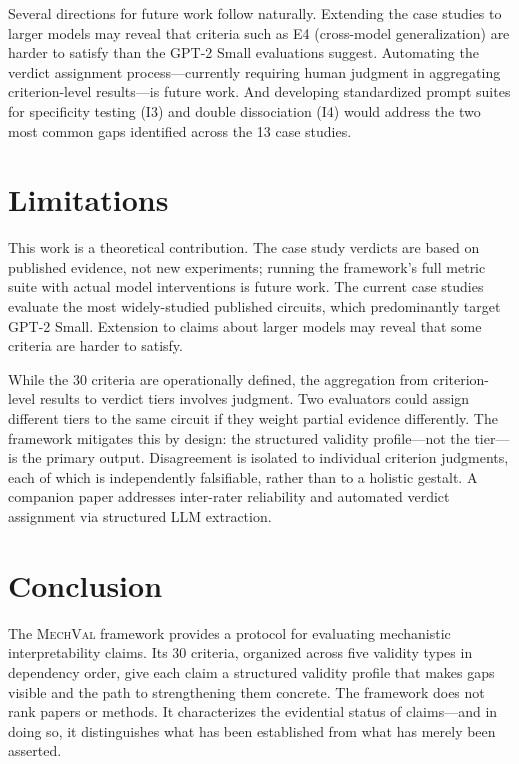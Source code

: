 \documentclass[10pt]{article}
\newcommand{\mechval}{\textsc{MechVal}}
\begin{document}
Several directions for future work follow naturally. Extending the case studies to larger models may reveal that criteria such as E4 (cross-model generalization) are harder to satisfy than the GPT-2 Small evaluations suggest. Automating the verdict assignment process---currently requiring human judgment in aggregating criterion-level results---is future work. And developing standardized prompt suites for specificity testing (I3) and double dissociation (I4) would address the two most common gaps identified across the 13 case studies.

\section{Limitations}
\label{sec:limitations}

This work is a theoretical contribution. The case study verdicts are based on published evidence, not new experiments; running the framework's full metric suite with actual model interventions is future work. The current case studies evaluate the most widely-studied published circuits, which predominantly target GPT-2 Small. Extension to claims about larger models may reveal that some criteria are harder to satisfy.

While the 30 criteria are operationally defined, the aggregation from criterion-level results to verdict tiers involves judgment. Two evaluators could assign different tiers to the same circuit if they weight partial evidence differently. The framework mitigates this by design: the structured validity profile---not the tier---is the primary output. Disagreement is isolated to individual criterion judgments, each of which is independently falsifiable, rather than to a holistic gestalt. A companion paper addresses inter-rater reliability and automated verdict assignment via structured LLM extraction.

\section{Conclusion}
\label{sec:conclusion}

The \mechval{} framework provides a protocol for evaluating mechanistic interpretability claims. Its 30 criteria, organized across five validity types in dependency order, give each claim a structured validity profile that makes gaps visible and the path to strengthening them concrete. The framework does not rank papers or methods. It characterizes the evidential status of claims---and in doing so, it distinguishes what has been established from what has merely been asserted.
\end{document}
